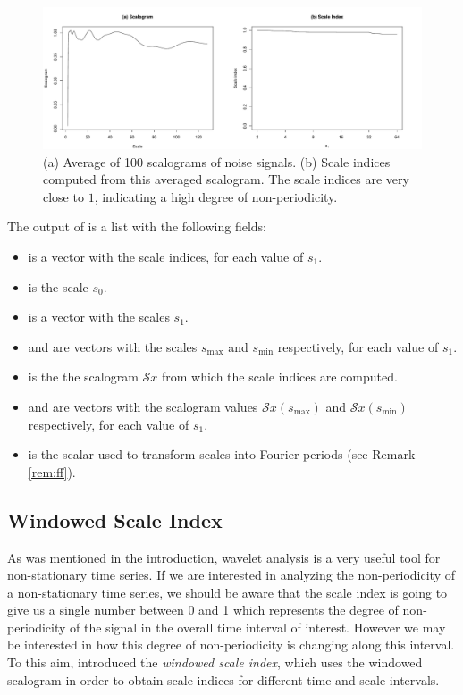 \begin{figure}[tbp]
\begin{center}
  \includegraphics[width=\textwidth]{Figure9}
\end{center}
\caption{(a) Average of 100 scalograms of noise signals. (b) Scale indices computed from this averaged scalogram. The scale indices are very close to $1$, indicating a high degree of non-periodicity.}
\label{fig:si_prng}
\end{figure}

The output of  is a list with the following fields:
\begin{itemize}
\item {} is a vector with the scale indices, for each value of $s_1$.
\item {} is the scale $s_0$.
\item {} is a vector with the scales $s_1$.
\item {} and  are vectors with the scales $s_{\textrm{max}}$ and $s_{\textrm{min}}$ respectively, for each value of $s_1$.
\item {} is the the scalogram  $\mathcal{S}x$ from which the scale indices are computed.
\item {} and  are vectors with the scalogram values $\mathcal{S}x(s_{\textrm{max}})$ and $\mathcal{S}x(s_{\textrm{min}})$ respectively, for each value of $s_1$.
\item {} is the scalar used to transform scales into Fourier periods (see Remark \ref{rem:ff}). 
\end{itemize}

\subsection{Windowed Scale Index}

As was mentioned in the introduction, wavelet analysis is a very useful tool for non-stationary time series. If we are interested in analyzing the non-periodicity of a non-stationary time series, we should be aware that the scale index is going to give us a single number between 0 and 1 which represents the degree of non-periodicity of the signal in the overall time interval of interest. However we may be interested in how this degree of non-periodicity is changing along this interval. To this aim, \citet{bol20} introduced the \emph{windowed scale index}, which uses the windowed scalogram in order to obtain scale indices for different time and scale intervals. 

